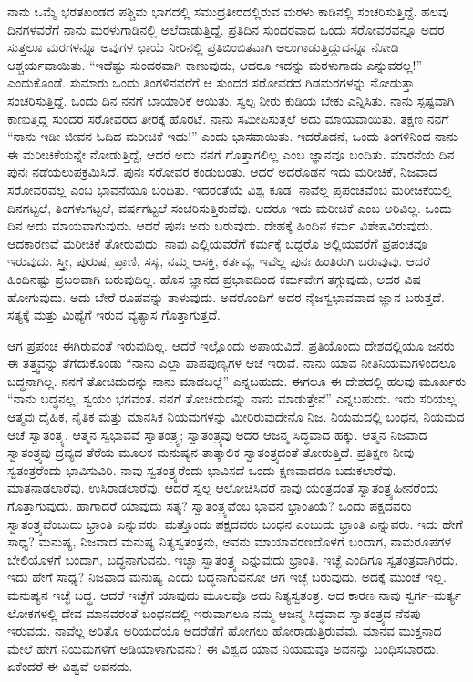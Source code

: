 ನಾನು ಒಮ್ಮೆ ಭರತಖಂಡದ ಪಶ್ಚಿಮ ಭಾಗದಲ್ಲಿ ಸಮುದ್ರತೀರದಲ್ಲಿರುವ ಮರಳು ಕಾಡಿನಲ್ಲಿ ಸಂಚರಿಸುತ್ತಿದ್ದೆ. ಹಲವು ದಿನಗಳವರೆಗೆ ನಾನು ಮರಳುಗಾಡಿನಲ್ಲಿ ಅಲೆದಾಡುತ್ತಿದ್ದೆ. ಪ್ರತಿದಿನ ಸುಂದರವಾದ ಒಂದು ಸರೋವರವನ್ನೂ ಅದರ ಸುತ್ತಲೂ ಮರಗಳನ್ನೂ ಅವುಗಳ ಛಾಯೆ ನೀರಿನಲ್ಲಿ ಪ್ರತಿಬಿಂಬಿತವಾಗಿ ಅಲುಗಾಡುತ್ತಿದ್ದುದನ್ನೂ ನೋಡಿ ಆಶ್ಚರ್ಯವಾಯಿತು. “ಇದೆಷ್ಟು ಸುಂದರವಾಗಿ ಕಾಣುವುದು, ಆದರೂ ಇದನ್ನು ಮರಳುಗಾಡು ಎನ್ನುವರಲ್ಲ!” ಎಂದುಕೊಂಡೆ. ಸುಮಾರು ಒಂದು ತಿಂಗಳಿನವರೆಗೆ ಆ ಸುಂದರ ಸರೋವರದ ಗಿಡಮರಗಳನ್ನು ನೋಡುತ್ತಾ ಸಂಚರಿಸುತ್ತಿದ್ದೆ. ಒಂದು ದಿನ ನನಗೆ ಬಾಯಾರಿಕೆ ಆಯಿತು. ಸ್ವಲ್ಪ ನೀರು ಕುಡಿಯ ಬೇಕು ಎನ್ನಿಸಿತು. ನಾನು ಸ್ಪಷ್ಟವಾಗಿ ಕಾಣುತ್ತಿದ್ದ ಸುಂದರ ಸರೋವರದ ತೀರಕ್ಕೆ ಹೊರಟೆ. ನಾನು ಸಮೀಪಿಸುತ್ತಲೆ ಅದು ಮಾಯವಾಯಿತು. ತಕ್ಷಣ ನನಗೆ “ನಾನು ಇಡೀ ಜೀವನ ಓದಿದ ಮರೀಚಿಕೆ ಇದು!” ಎಂದು ಭಾಸವಾಯಿತು. ಇದರೊಡನೆ, ಒಂದು ತಿಂಗಳಿನಿಂದ ನಾನು ಈ ಮರೀಚಿಕೆಯನ್ನೇ ನೋಡುತ್ತಿದ್ದೆ, ಆದರೆ ಅದು ನನಗೆ ಗೊತ್ತಾಗಲಿಲ್ಲ ಎಂಬ ಜ್ಞಾನವೂ ಬಂದಿತು. ಮಾರನೆಯ ದಿನ ಪುನಃ ನಡೆಯಲುಪಕ್ರಮಿಸಿದೆ. ಪುನಃ ಸರೋವರ ಕಂಡುಬಂತು. ಆದರೆ ಅದರೊಡನೆ ಇದು ಮರೀಚಿಕೆ, ನಿಜವಾದ ಸರೋವರವಲ್ಲ ಎಂಬ ಭಾವನೆಯೂ ಬಂದಿತು. ಇದರಂತೆಯೆ ವಿಶ್ವ ಕೂಡ. ನಾವೆಲ್ಲ ಪ್ರಪಂಚವೆಂಬ ಮರೀಚಿಕೆಯಲ್ಲಿ ದಿನಗಟ್ಟಲೆ, ತಿಂಗಳುಗಟ್ಟಲೆ, ವರ್ಷಗಟ್ಟಲೆ ಸಂಚರಿಸುತ್ತಿರುವೆವು. ಆದರೂ ಇದು ಮರೀಚಿಕೆ ಎಂಬ ಅರಿವಿಲ್ಲ. ಒಂದು ದಿನ ಅದು ಮಾಯವಾಗುವುದು. ಆದರೆ ಪುನಃ ಅದು ಬರುವುದು. ದೇಹಕ್ಕೆ ಹಿಂದಿನ ಕರ್ಮ ವಿಶೇಷವಿರುವುದು. ಆದಕಾರಣವೆ ಮರೀಚಿಕೆ ತೋರುವುದು. ನಾವು ಎಲ್ಲಿಯವರೆಗೆ ಕರ್ಮಕ್ಕೆ ಬದ್ದರೊ ಅಲ್ಲಿಯವರೆಗೆ ಪ್ರಪಂಚವೂ ಇರುವುದು. ಸ್ತ್ರೀ, ಪುರುಷ, ಪ್ರಾಣಿ, ಸಸ್ಯ, ನಮ್ಮ ಆಸಕ್ತಿ, ಕರ್ತವ್ಯ, ಇವೆಲ್ಲ ಪುನಃ ಹಿಂತಿರುಗಿ ಬರುವುವು. ಆದರೆ ಹಿಂದಿನಷ್ಟು ಪ್ರಬಲವಾಗಿ ಬರುವುದಿಲ್ಲ. ಹೊಸ ಜ್ಞಾನದ ಪ್ರಭಾವದಿಂದ ಕರ್ಮವೇಗ ತಗ್ಗುವುದು, ಅದರ ವಿಷ ಹೋಗುವುದು. ಅದು ಬೇರೆ ರೂಪವನ್ನು ತಾಳುವುದು. ಅದರೊಂದಿಗೆ ಅದರ ನೈಜಸ್ವಭಾವವಾದ ಜ್ಞಾನ ಬರುತ್ತದೆ. ಸತ್ಯಕ್ಕೆ ಮತ್ತು ಮಿಥ್ಯೆಗೆ ಇರುವ ವ್ಯತ್ಯಾಸ ಗೊತ್ತಾಗುತ್ತದೆ.

ಆಗ ಪ್ರಪಂಚ ಈಗಿರುವಂತೆ ಇರುವುದಿಲ್ಲ. ಆದರೆ ಇಲ್ಲೊಂದು ಅಪಾಯವಿದೆ. ಪ್ರತಿಯೊಂದು ದೇಶದಲ್ಲಿಯೂ ಜನರು ಈ ತತ್ತ್ವವನ್ನು ತೆಗೆದುಕೊಂಡು “ನಾನು ಎಲ್ಲಾ ಪಾಪಪುಣ್ಯಗಳ ಆಚೆ ಇರುವೆ. ನಾನು ಯಾವ ನೀತಿನಿಯಮಗಳಿಂದಲೂ ಬದ್ಧನಾಗಿಲ್ಲ. ನನಗೆ ತೋಚಿದುದನ್ನು ನಾನು ಮಾಡಬಲ್ಲೆ” ಎನ್ನಬಹುದು. ಈಗಲೂ ಈ ದೇಶದಲ್ಲಿ ಹಲವು ಮೂರ್ಖರು “ನಾನು ಬದ್ಧನಲ್ಲ, ಸ್ವಯಂ ಭಗವಂತ. ನನಗೆ ತೋಚಿದುದನ್ನು ನಾನು ಮಾಡುತ್ತೇನೆ” ಎನ್ನಬಹುದು. ಇದು ಸರಿಯಲ್ಲ. ಆತ್ಮವು ದೈಹಿಕ, ನೈತಿಕ ಮತ್ತು ಮಾನಸಿಕ ನಿಯಮಗಳನ್ನು ಮೀರಿರುವುದೇನೊ ನಿಜ. ನಿಯಮದಲ್ಲಿ ಬಂಧನ, ನಿಯಮದ ಆಚೆ ಸ್ವಾತಂತ್ರ್ಯ. ಆತ್ಮನ ಸ್ವಭಾವವೆ ಸ್ವಾತಂತ್ರ್ಯ; ಸ್ವಾತಂತ್ರ್ಯವು ಅದರ ಆಜನ್ಮ ಸಿದ್ಧವಾದ ಹಕ್ಕು. ಆತ್ಮನ ನಿಜವಾದ ಸ್ವಾತಂತ್ರ್ಯವು ದ್ರವ್ಯದ ತೆರೆಯ ಮೂಲಕ ಮನುಷ್ಯನ ತಾತ್ಕಾಲಿಕ ಸ್ವಾತಂತ್ರ್ಯದಂತೆ ತೋರುತ್ತಿದೆ. ಪ್ರತಿಕ್ಷಣ ನೀವು ಸ್ವತಂತ್ರರೆಂದು ಭಾವಿಸುವಿರಿ. ನಾವು ಸ್ವತಂತ್ರ್ಯರೆಂದು ಭಾವಿಸದೆ ಒಂದು ಕ್ಷಣವಾದರೂ ಬದುಕಲಾರೆವು. ಮಾತನಾಡಲಾರೆವು. ಉಸಿರಾಡಲಾರೆವು. ಆದರೆ ಸ್ವಲ್ಪ ಆಲೋಚಿಸಿದರೆ ನಾವು ಯಂತ್ರದಂತೆ ಸ್ವಾತಂತ್ರ್ಯಹೀನರೆಂದು ಗೊತ್ತಾಗುವುದು. ಹಾಗಾದರೆ ಯಾವುದು ಸತ್ಯ? ಸ್ವಾತಂತ್ರ್ಯವೆಂಬ ಭಾವನೆ ಭ್ರಾಂತಿಯೆ? ಒಂದು ಪಕ್ಷದವರು ಸ್ವಾತಂತ್ರ್ಯವೆಂಬುದು ಭ್ರಾಂತಿ ಎನ್ನುವರು. ಮತ್ತೊಂದು ಪಕ್ಷದವರು ಬಂಧನ ಎಂಬುದು ಭ್ರಾಂತಿ ಎನ್ನುವರು. ಇದು ಹೇಗೆ ಸಾಧ್ಯ? ಮನುಷ್ಯ, ನಿಜವಾದ ಮನುಷ್ಯ ನಿತ್ಯಸ್ವತಂತ್ರನು, ಅವನು ಮಾಯಾವರಣದೊಳಗೆ ಬಂದಾಗ, ನಾಮರೂಪಗಳ ಬೇಲಿಯೊಳಗೆ ಬಂದಾಗ, ಬದ್ಧನಾಗುವನು. ಇಚ್ಛಾ ಸ್ವಾತಂತ್ರ್ಯ ಎನ್ನುವುದು ಭ್ರಾಂತಿ. ಇಚ್ಛೆ ಎಂದಿಗೂ ಸ್ವತಂತ್ರವಾಗಿರದು. ಇದು ಹೇಗೆ ಸಾಧ್ಯ? ನಿಜವಾದ ಮನುಷ್ಯ ಎಂದು ಬದ್ಧನಾಗುವನೋ ಆಗ ಇಚ್ಛೆ ಬರುವುದು. ಅದಕ್ಕೆ ಮುಂಚೆ ಇಲ್ಲ. ಮನುಷ್ಯನ ಇಚ್ಛೆ ಬದ್ಧ. ಆದರೆ ಇಚ್ಛೆಗೆ ಯಾವುದು ಮೂಲವೊ ಅದು ನಿತ್ಯಸ್ವತಂತ್ರ. ಆದ ಕಾರಣ ನಾವು ಸ್ವರ್ಗ–ಮರ್ತ್ಯ ಲೋಕಗಳಲ್ಲಿ ದೇವ ಮಾನವರಂತೆ ಬಂಧನದಲ್ಲಿ ಇರುವಾಗಲೂ ನಮ್ಮ ಆಜನ್ಮ ಸಿದ್ಧವಾದ ಸ್ವಾತಂತ್ರ್ಯದ ನೆನಪು ಇರುವದು. ನಾವೆಲ್ಲ ಅರಿತೊ ಅರಿಯದೆಯೊ ಅದರೆಡೆಗೆ ಹೋಗಲು ಹೋರಾಡುತ್ತಿರುವೆವು. ಮಾನವ ಮುಕ್ತನಾದ ಮೇಲೆ ಹೇಗೆ ನಿಯಮಗಳಿಗೆ ಅಡಿಯಾಳಾಗುವನು? ಈ ವಿಶ್ವದ ಯಾವ ನಿಯಮವೂ ಅವನನ್ನು ಬಂಧಿಸಬಾರದು. ಏಕೆಂದರೆ ಈ ವಿಶ್ವವೆ ಅವನದು.

